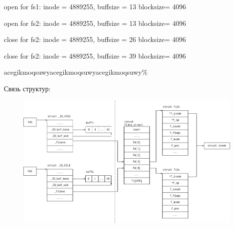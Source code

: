 open for fs1: inode  = 4889255, buffsize = 13 blocksize= 4096

open for fs2: inode  = 4889255, buffsize = 13 blocksize= 4096

close for fs2: inode  = 4889255, buffsize = 26 blocksize= 4096

close for fs2: inode  = 4889255, buffsize = 39 blocksize= 4096

acegikmoqsuwyacegikmoqsuwyacegikmoqsuwy\%

Связь структур:
\begin{figure}[H]
	\centering
	\includegraphics[scale=0.55]{assets/d_3.png}
\end{figure}
